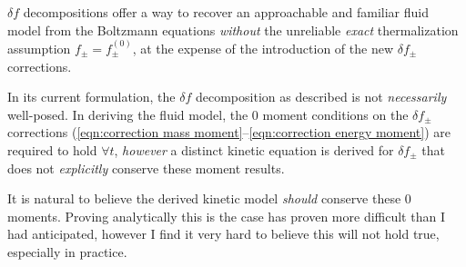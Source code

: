     $\delta\!f$ decompositions offer a way to recover an approachable and familiar fluid model from the Boltzmann equations \emph{without} the unreliable \emph{exact} thermalization assumption $f_{\pm}  =  f_{\pm}^{(0)}$, at the expense of the introduction of the new $\delta\!f_{\pm}$ corrections.

    \line

    In its current formulation, the $\delta\!f$ decomposition as described is not \emph{necessarily} well-posed. In deriving the fluid model, the 0 moment conditions on the $\delta\!f_{\pm}$ corrections (\ref{eqn:correction mass moment}--\ref{eqn:correction energy moment}) are required to hold $\forall t$, \emph{however} a distinct kinetic equation is derived for $\delta\!f_{\pm}$ that does not \emph{explicitly} conserve these moment results.

    \begin{remark}
        It is natural to believe the derived kinetic model \emph{should} conserve these 0 moments. Proving analytically this is the case has proven more difficult than I had anticipated, however I find it very hard to believe this will not hold true, especially in practice.
    \end{remark}

